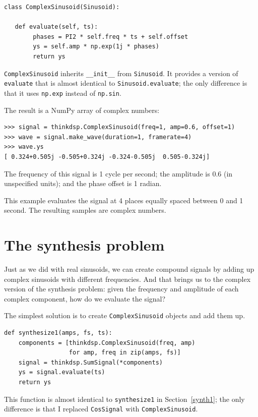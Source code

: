 \documentclass[12pt]{book}
\begin{document}
\begin{verbatim}
class ComplexSinusoid(Sinusoid):
 
   def evaluate(self, ts):
        phases = PI2 * self.freq * ts + self.offset
        ys = self.amp * np.exp(1j * phases)
        return ys
\end{verbatim}

{\tt ComplexSinusoid} inherits \verb"__init__" from
{\tt Sinusoid}.  It provides a version of {\tt evaluate}
that is almost identical to {\tt Sinusoid.evaluate}; the
only difference is that it uses {\tt np.exp} instead of
{\tt np.sin}.

The result is a NumPy array of complex numbers:

\begin{verbatim}
>>> signal = thinkdsp.ComplexSinusoid(freq=1, amp=0.6, offset=1)
>>> wave = signal.make_wave(duration=1, framerate=4)
>>> wave.ys
[ 0.324+0.505j -0.505+0.324j -0.324-0.505j  0.505-0.324j]
\end{verbatim}

The frequency of this signal is 1 cycle per second; the amplitude
is 0.6 (in unspecified units); and the phase offset is 1 radian.

This example evaluates the signal at 4 places equally spaced between
0 and 1 second.  The resulting samples are complex numbers.


\section{The synthesis problem}

Just as we did with real sinusoids, we can create compound signals
by adding up complex sinusoids with different frequencies.  And that
brings us to the complex version of the synthesis problem: given the
frequency and amplitude of each complex component, how do we evaluate the
signal?

The simplest solution is to create {\tt ComplexSinusoid} objects and
add them up.

\begin{verbatim}
def synthesize1(amps, fs, ts):
    components = [thinkdsp.ComplexSinusoid(freq, amp)
                  for amp, freq in zip(amps, fs)]
    signal = thinkdsp.SumSignal(*components)
    ys = signal.evaluate(ts)
    return ys
\end{verbatim}

This function is almost identical to {\tt synthesize1} in
Section~\ref{synth1}; the only difference is that I replaced
{\tt CosSignal} with {\tt ComplexSinusoid}.
\end{document}
